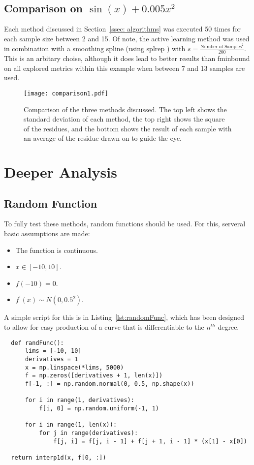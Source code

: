 \subsection[Comparison One]{Comparison on $\sin(x)+0.005x^2$}

Each method discussed in Section~\ref{ssec: algorithms} was executed 50 times for each sample size between 2 and 15. Of note, the active learning method was used in combination with a smoothing spline (using splrep \cite{2020SciPy-NMeth}) with ${s = \frac{\text{Number of Samples}^2}{200}}$. This is an arbitary choise, although it does lead to better results than fminbound on all explored metrics within this example when between 7 and 13 samples are used.

\begin{figure}[htbp!] 
  \centering    
  \texttt{[image: comparison1.pdf]}
  \caption[First Comparison]{Comparison of the three methods discussed. The top left shows the standard deviation of each method, the top right shows the square of the residues, and the bottom shows the result of each sample with an average of the residue drawn on to guide the eye.}
  \label{fig:firstComparison}
\end{figure}

\section{Deeper Analysis}
\subsection{Random Function}
To fully test these methods, random functions should be used. For this, serveral basic assumptions are made:
\begin{itemize}
  \item The function is continuous.
  \item $x\in[-10, 10]$.
  \item $f(-10)=0$.
  \item $f^{\prime}(x)\sim N(0, 0.5^2)$.
\end{itemize}
A simple script for this is in Listing~\ref{lst:randomFunc}, which has been designed to allow for easy production of a curve that is differentiable to the $n^{th}$ degree.

\lstset{language=Python}
\lstset{frame=lines}
\lstset{basicstyle=\footnotesize}
\begin{lstlisting}
  def randFunc():
      lims = [-10, 10]
      derivatives = 1
      x = np.linspace(*lims, 5000)
      f = np.zeros([derivatives + 1, len(x)])
      f[-1, :] = np.random.normal(0, 0.5, np.shape(x))

      for i in range(1, derivatives):
          f[i, 0] = np.random.uniform(-1, 1)

      for i in range(1, len(x)):
          for j in range(derivatives):
              f[j, i] = f[j, i - 1] + f[j + 1, i - 1] * (x[1] - x[0])

  return interp1d(x, f[0, :])

\end{lstlisting}




